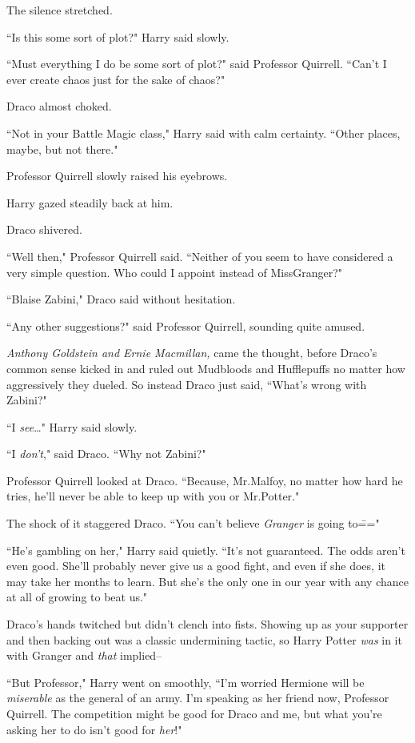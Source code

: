 The silence stretched.

``Is this some sort of plot?" Harry said slowly.

``Must everything I do be some sort of plot?" said Professor Quirrell. ``Can't I ever create chaos just for the sake of chaos?"

Draco almost choked.

``Not in your Battle Magic class," Harry said with calm certainty. ``Other places, maybe, but not there."

Professor Quirrell slowly raised his eyebrows.

Harry gazed steadily back at him.

Draco shivered.

``Well then," Professor Quirrell said. ``Neither of you seem to have considered a very simple question. Who could I appoint instead of Miss\?Granger?"

``Blaise Zabini," Draco said without hesitation.

``Any other suggestions?" said Professor Quirrell, sounding quite amused.

\emph{Anthony Goldstein and Ernie Macmillan,} came the thought, before Draco's common sense kicked in and ruled out Mudbloods and Hufflepuffs no matter how aggressively they dueled. So instead Draco just said, ``What's wrong with Zabini?"

``I \emph{see}{\ldots}" Harry said slowly.

``I \emph{don't}," said Draco. ``Why not Zabini?"

Professor Quirrell looked at Draco. ``Because, Mr.\?Malfoy, no matter how hard he tries, he'll never be able to keep up with you or Mr.\?Potter."

The shock of it staggered Draco. ``You can't believe \emph{Granger} is going to\==="

``He's gambling on her," Harry said quietly. ``It's not guaranteed. The odds aren't even good. She'll probably never give us a good fight, and even if she does, it may take her months to learn. But she's the only one in our year with any chance at all of growing to beat us."

Draco's hands twitched but didn't clench into fists. Showing up as your supporter and then backing out was a classic undermining tactic, so Harry Potter \emph{was} in it with Granger and \emph{that} implied\---

``But Professor," Harry went on smoothly, ``I'm worried Hermione will be \emph{miserable} as the general of an army. I'm speaking as her friend now, Professor Quirrell. The competition might be good for Draco and me, but what you're asking her to do isn't good for \emph{her}!"


